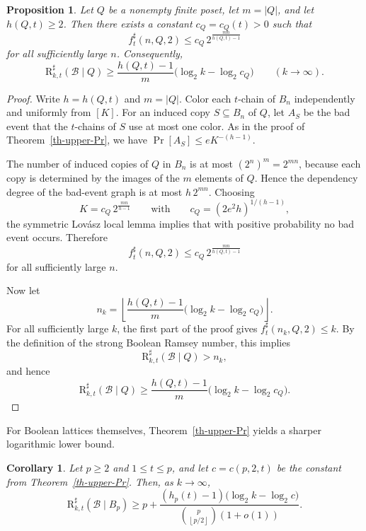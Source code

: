 \documentclass[twoside,12pt]{article}
\newcommand{\flr}[1]{\left\lfloor #1 \right\rfloor}
\newcommand{\floor}[1]{\flr{#1}}
\newtheorem{corollary}[theorem]{Corollary}
\newtheorem{proposition}[theorem]{Proposition}
\newcommand{\BRs}{\mathrm{R}^{\sharp}}
\begin{document}
\begin{proposition}\label{prop:general-log-lower}
Let $Q$ be a nonempty finite poset, let $m=|Q|$, and let $h(Q,t)\ge2$. Then there exists a constant $c_Q=c_Q(t)>0$ such that
\[
f_t^\sharp(n,Q,2)
\le
c_Q\,2^{\frac{mn}{h(Q,t)-1}}
\]
for all sufficiently large $n$. Consequently,
\[
\BRs_{k,t}(\mathcal B\mid Q)
\ge
\frac{h(Q,t)-1}{m}\bigl(\log_2 k-\log_2 c_Q\bigr)
\qquad (k\to\infty).
\]
\end{proposition}

\begin{proof}
Write $h=h(Q,t)$ and $m=|Q|$. Color each $t$-chain of $B_n$ independently and uniformly from $[K]$. For an induced copy $S\subseteq B_n$ of $Q$, let $A_S$ be the bad event that the $t$-chains of $S$ use at most one color. As in the proof of Theorem~\ref{th-upper-Pr}, we have
$\Pr[A_S]\le eK^{-(h-1)}$.

The number of induced copies of $Q$ in $B_n$ is at most $(2^n)^m=2^{mn}$, because each copy is determined by the images of the $m$ elements of $Q$. Hence the dependency degree of the bad-event graph is at most $h\,2^{mn}$. Choosing
\[
K=c_Q\,2^{\frac{mn}{h-1}}
\qquad\text{with}\qquad
c_Q=(2e^2h)^{1/(h-1)},
\]
the symmetric Lov\'asz local lemma implies that with positive probability no bad event occurs. Therefore
\[
f_t^\sharp(n,Q,2)
\le
c_Q\,2^{\frac{mn}{h(Q,t)-1}}
\]
for all sufficiently large $n$.

Now let
\[
n_k=\left\lfloor \frac{h(Q,t)-1}{m}\bigl(\log_2 k-\log_2 c_Q\bigr)\right\rfloor.
\]
For all sufficiently large $k$, the first part of the proof gives $f_t^\sharp(n_k,Q,2)\le k$. By the definition of the strong Boolean Ramsey number, this implies
\[
\BRs_{k,t}(\mathcal B\mid Q)>n_k,
\]
and hence
\[
\BRs_{k,t}(\mathcal B\mid Q)
\ge
\frac{h(Q,t)-1}{m}\bigl(\log_2 k-\log_2 c_Q\bigr).
\]
\end{proof}

For Boolean lattices themselves, Theorem~\ref{th-upper-Pr} yields a sharper logarithmic lower bound.

\begin{corollary}\label{cor-R-lower}
Let $p\ge2$ and $1\le t\le p$, and let $c=c(p,2,t)$ be the constant from Theorem~\ref{th-upper-Pr}. Then, as $k\to\infty$,
\[
\BRs_{k,t}(\mathcal B\mid B_p)
\ge
p+\frac{(h_p(t)-1)\bigl(\log_2 k-\log_2 c\bigr)}{\binom{p}{\floor{p/2}}(1+o(1))}.
\]
\end{corollary}
\end{document}
